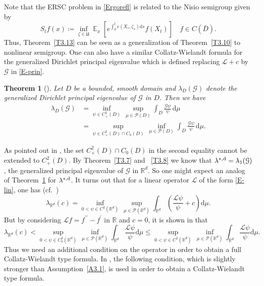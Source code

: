 \documentclass[notitlepage,11pt,reqno]{amsart}
\numberwithin{equation}{section}
\theoremstyle{plain}
\newtheorem{theorem}{Theorem}[section]
\theoremstyle{definition}
\theoremstyle{remark}
\newcommand{\cG}{{\mathcal{G}}}     %
\newcommand{\sL}{{\mathscr{L}}}
\newcommand{\Pm}{{\mathcal{P}}}     %
\newcommand{\Uadm}{\mathfrak{U}}
\newcommand{\lamstrdf}{\lambda^{*,{\rm d}}}
\newcommand{\RR}{\mathds{R}} %
\newcommand{\Rd}{{\mathds{R}^{d}}}
\DeclareMathOperator{\Exp}{\mathbb{E}} %
\newcommand{\D}{\mathrm{d}} %
\newcommand{\df}{\coloneqq}
\begin{document}
Note that the ERSC problem in \eqref{Ergorefl} is related to the Nisio semigroup given by
$$S_t f(x)\df \inf_{\zeta\in\Uadm}\Exp_x\left[e^{\int_0^t c(X_s, \zeta_s)\D{s}} f(X_t)\right] \quad f\in C(\bar{D}).$$
Thus, Theorem~\ref{T3.13} can be seen as a generalization of Theorem~\ref{T3.10} to nonlinear semigroup. 
One can also have a similar Collatz-Wielandt formula for the  generalized Dirichlet principal eigenvalue which is defined
replacing $\sL+c$ by $\cG$ in \eqref{E-prin}.
\begin{theorem}[\cite{MR4048004}]\label{T3.14}
Let $D$ be a bounded, smooth domain and $\lambda_D(\cG)$ denote the generalized Dirichlet principal eigenvalue of $\cG$ in $D$. Then we have
\begin{align*}
\lambda_D(\cG)&= \inf_{\psi\in C^2_+(D)}\, \sup_{\mu\in\Pm(D)} \int_D \frac{\cG\psi}{\psi}\, \D\mu
\\
&= \sup_{\psi\in C^2_+(D)\cap C_0(D)}\, \inf_{\mu\in\Pm(D)} \int_D \frac{\cG\psi}{\psi}\, \D\mu.
\end{align*}
\end{theorem}
As pointed out in \cite[Remark~2.2]{MR4048004}, the set $C^2_+(D)\cap C_0(D)$ in the second equality cannot be extended to $C^2_+(D)$. By Theorem~\ref{T3.7} and ~\ref{T3.8}
we know that $\lamstrdf=\lambda_1(\cG)$, the generalized principal eigenvalue of $\cG$ in $\Rd$. So one might expect an analog of  Theorem~\ref{T3.14} for $\lamstrdf$. It turns out that for a linear operator $\sL$ of the form \eqref{E-lin}, one has (cf.\ \cite{MR4048004})
$$\lambda_{\Rd}(c)=\inf_{0<\psi\in C^2(\Rd)}\,
\sup_{\mu\in\Pm(\Rd)}\int_{\Rd}\left(\frac{\sL \psi}{\psi} +c\right)\D\mu.$$
But by considering $\sL f= f^{\prime\prime}-f^\prime$ in $\RR$ and $c=0$,
it is shown in \cite[Example~2.3]{MR4048004} that 
$$\lambda_{\Rd}(c)< \sup_{0<\psi\in C^2_b(\Rd)}\,
\inf_{\mu\in\Pm(\Rd)}\int_{\Rd}\frac{\sL \psi}{\psi}\D\mu
\leq \sup_{0<\psi\in C^2(\Rd)}\,
\inf_{\mu\in\Pm(\Rd)}\int_{\Rd}\frac{\sL \psi}{\psi}\D\mu.$$
Thus we need an additional condition on the operator in order to obtain a 
full Collatz-Wielandt type formula. In \cite{MR4048004}, the following
condition, which is slightly stronger than
Assumption~\ref{A3.1}, is used in order to obtain a
Collatz-Wielandt type formula.
\end{document}
